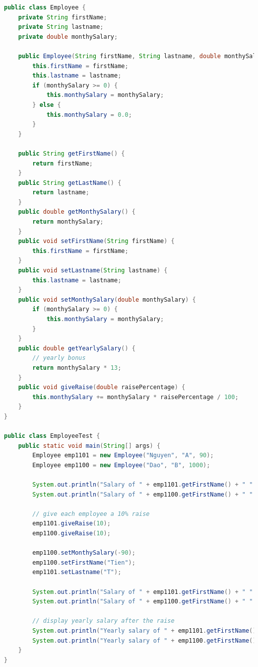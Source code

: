 \documentclass{article}
\begin{document}
\begin{lstlisting}[language=Java, caption=Employee and EmployeeTest Classes]
public class Employee {
    private String firstName;
    private String lastname;
    private double monthySalary;

    public Employee(String firstName, String lastname, double monthySalary) {
        this.firstName = firstName;
        this.lastname = lastname;
        if (monthySalary >= 0) {
            this.monthySalary = monthySalary;
        } else {
            this.monthySalary = 0.0;
        }
    }

    public String getFirstName() {
        return firstName;
    }
    public String getLastName() {
        return lastname;
    }
    public double getMonthySalary() {
        return monthySalary;
    }
    public void setFirstName(String firstName) {
        this.firstName = firstName;
    }
    public void setLastname(String lastname) {
        this.lastname = lastname;
    }
    public void setMonthySalary(double monthySalary) {
        if (monthySalary >= 0) {
            this.monthySalary = monthySalary;
        }
    }
    public double getYearlySalary() {
        // yearly bonus
        return monthySalary * 13;
    }
    public void giveRaise(double raisePercentage) {
        this.monthySalary += monthySalary * raisePercentage / 100;
    }
}

public class EmployeeTest {
    public static void main(String[] args) {
        Employee emp1101 = new Employee("Nguyen", "A", 90);
        Employee emp1100 = new Employee("Dao", "B", 1000);

        System.out.println("Salary of " + emp1101.getFirstName() + " " + emp1101.getLastName() + ": " + emp1101.getMonthySalary());
        System.out.println("Salary of " + emp1100.getFirstName() + " " + emp1100.getLastName() + ": " + emp1100.getMonthySalary());

        // give each employee a 10% raise
        emp1101.giveRaise(10);
        emp1100.giveRaise(10);

        emp1100.setMonthySalary(-90);
        emp1100.setFirstName("Tien");
        emp1101.setLastname("T");

        System.out.println("Salary of " + emp1101.getFirstName() + " " + emp1101.getLastName() + " after 10% raise: " + emp1101.getMonthySalary());
        System.out.println("Salary of " + emp1100.getFirstName() + " " + emp1100.getLastName() + " after 10% raise: " + emp1100.getMonthySalary());

        // display yearly salary after the raise
        System.out.println("Yearly salary of " + emp1101.getFirstName() + " " + emp1101.getLastName() + " after 10% raise: " + emp1101.getYearlySalary());
        System.out.println("Yearly salary of " + emp1100.getFirstName() + " " + emp1100.getLastName() + " after 10% raise: " + emp1100.getYearlySalary());
    }
}
\end{lstlisting}
\end{document}
